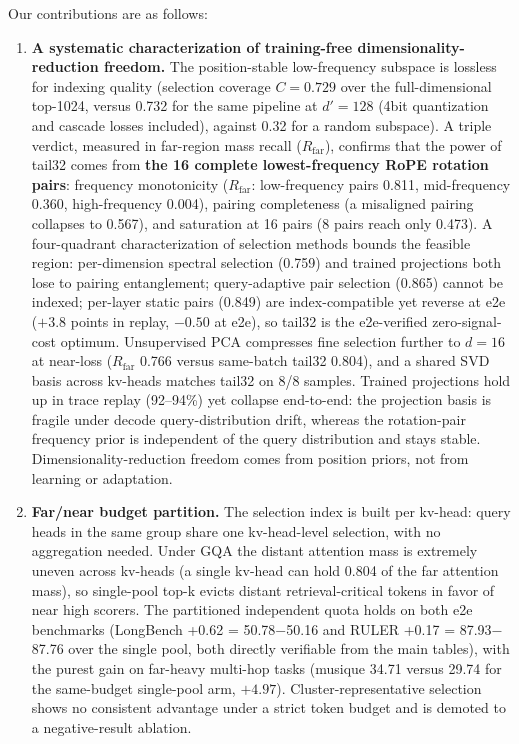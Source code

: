 \documentclass[11pt]{article}
\begin{document}
Our contributions are as follows:
\begin{enumerate}
\item \textbf{A systematic characterization of training-free dimensionality-reduction freedom.} The position-stable low-frequency subspace is lossless for indexing quality (selection coverage $C{=}0.729$ over the full-dimensional top-1024, versus 0.732 for the same pipeline at $d'{=}128$ (4bit quantization and cascade losses included), against 0.32 for a random subspace). A triple verdict, measured in far-region mass recall ($R_{\mathrm{far}}$), confirms that the power of tail32 comes from \textbf{the 16 complete lowest-frequency RoPE rotation pairs}: frequency monotonicity ($R_{\mathrm{far}}$: low-frequency pairs 0.811, mid-frequency 0.360, high-frequency 0.004), pairing completeness (a misaligned pairing collapses to 0.567), and saturation at 16 pairs (8 pairs reach only 0.473). A four-quadrant characterization of selection methods bounds the feasible region: per-dimension spectral selection (0.759) and trained projections both lose to pairing entanglement; query-adaptive pair selection (0.865) cannot be indexed; per-layer static pairs (0.849) are index-compatible yet reverse at e2e ($+3.8$ points in replay, $-0.50$ at e2e), so tail32 is the e2e-verified zero-signal-cost optimum. Unsupervised PCA compresses fine selection further to $d{=}16$ at near-loss ($R_{\mathrm{far}}$ 0.766 versus same-batch tail32 0.804), and a shared SVD basis across kv-heads matches tail32 on 8/8 samples. Trained projections hold up in trace replay (92--94\%) yet collapse end-to-end: the projection basis is fragile under decode query-distribution drift, whereas the rotation-pair frequency prior is independent of the query distribution and stays stable. Dimensionality-reduction freedom comes from position priors, not from learning or adaptation.
\item \textbf{Far/near budget partition.} The selection index is built per kv-head: query heads in the same group share one kv-head-level selection, with no aggregation needed. Under GQA the distant attention mass is extremely uneven across kv-heads (a single kv-head can hold 0.804 of the far attention mass), so single-pool top-k evicts distant retrieval-critical tokens in favor of near high scorers. The partitioned independent quota holds on both e2e benchmarks (LongBench +0.62 = 50.78$-$50.16 and RULER +0.17 = 87.93$-$87.76 over the single pool, both directly verifiable from the main tables), with the purest gain on far-heavy multi-hop tasks (musique 34.71 versus 29.74 for the same-budget single-pool arm, $+4.97$). Cluster-representative selection shows no consistent advantage under a strict token budget and is demoted to a negative-result ablation.

\end{enumerate}
\end{document}
